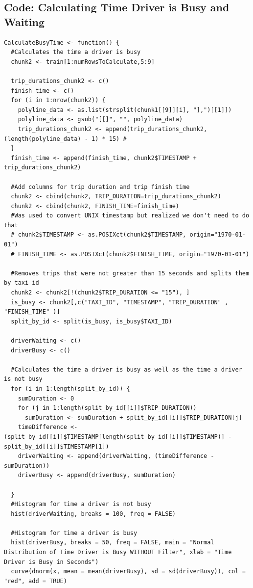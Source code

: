 \documentclass{article}
\numberwithin{equation}{section}
\begin{document}
\subsection{Code: Calculating Time Driver is Busy and Waiting} 
\begin{lstlisting}
CalculateBusyTime <- function() {
  #Calculates the time a driver is busy
  chunk2 <- train[1:numRowsToCalculate,5:9]
  
  trip_durations_chunk2 <- c()
  finish_time <- c()
  for (i in 1:nrow(chunk2)) {
    polyline_data <- as.list(strsplit(chunk1[[9]][i], "],")[[1]])
    polyline_data <- gsub("[[]", "", polyline_data)
    trip_durations_chunk2 <- append(trip_durations_chunk2, (length(polyline_data) - 1) * 15) # 
  }
  finish_time <- append(finish_time, chunk2$TIMESTAMP + trip_durations_chunk2)
  
  #Add columns for trip duration and trip finish time
  chunk2 <- cbind(chunk2, TRIP_DURATION=trip_durations_chunk2)
  chunk2 <- cbind(chunk2, FINISH_TIME=finish_time)
  #Was used to convert UNIX timestamp but realized we don't need to do that
  # chunk2$TIMESTAMP <- as.POSIXct(chunk2$TIMESTAMP, origin="1970-01-01")
  # FINISH_TIME <- as.POSIXct(chunk2$FINISH_TIME, origin="1970-01-01")
  
  #Removes trips that were not greater than 15 seconds and splits them by taxi id
  chunk2 <- chunk2[!(chunk2$TRIP_DURATION <= "15"), ]
  is_busy <- chunk2[,c("TAXI_ID", "TIMESTAMP", "TRIP_DURATION" , "FINISH_TIME" )]
  split_by_id <- split(is_busy, is_busy$TAXI_ID)
  
  driverWaiting <- c()
  driverBusy <- c()
  
  #Calculates the time a driver is busy as well as the time a driver is not busy
  for (i in 1:length(split_by_id)) {
    sumDuration <- 0
    for (j in 1:length(split_by_id[[i]]$TRIP_DURATION))
      sumDuration <- sumDuration + split_by_id[[i]]$TRIP_DURATION[j]
    timeDifference <- (split_by_id[[i]]$TIMESTAMP[length(split_by_id[[i]]$TIMESTAMP)] - split_by_id[[i]]$TIMESTAMP[1])
    driverWaiting <- append(driverWaiting, (timeDifference - sumDuration))
    driverBusy <- append(driverBusy, sumDuration)
    
  }
  #Histogram for time a driver is not busy
  hist(driverWaiting, breaks = 100, freq = FALSE)
  
  #Histogram for time a driver is busy
  hist(driverBusy, breaks = 50, freq = FALSE, main = "Normal Distribution of Time Driver is Busy WITHOUT Filter", xlab = "Time Driver is Busy in Seconds")
  curve(dnorm(x, mean = mean(driverBusy), sd = sd(driverBusy)), col = "red", add = TRUE)
  

\end{lstlisting}
\end{document}
